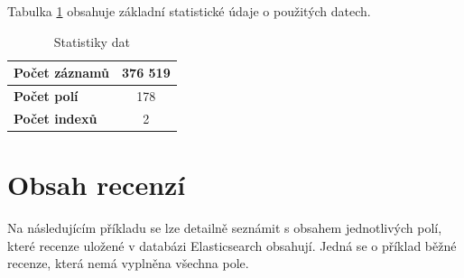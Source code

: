 \documentclass[czech,BP]{thesiskiv}
\begin{document}
Tabulka \ref{statistiky} obsahuje základní statistické údaje o použitých datech.

\begin{table}[h]
\centering
\begin{tabular}{l|c}
	\hline 
	\textbf{Počet záznamů} & 376 519 \\ \hline
	\textbf{Počet polí}    & 178     \\ 
	\textbf{Počet indexů}  & 2       \\ \hline
\end{tabular}
\caption{Statistiky dat}
\label{statistiky}
\end{table}

\section{Obsah recenzí}
Na následujícím příkladu se lze detailně seznámit s obsahem jednotlivých polí, které recenze uložené v databázi Elasticsearch obsahují. Jedná se o příklad běžné recenze, která nemá vyplněna všechna pole.

\end{document}
